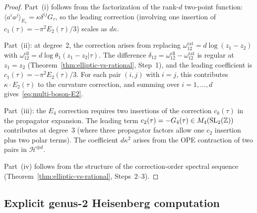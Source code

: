 \begin{proof}
Part~(i) follows from the factorization of the rank-$d$ two-point
function: $\langle a^i a^j \rangle_{E_\tau} = \kappa\delta^{ij}
G_\tau$, so the leading correction (involving one insertion of
$c_1(\tau) = -\pi^2 E_2(\tau)/3$) scales as $d\kappa$.

Part~(ii): at degree~2, the correction arises from replacing
$\omega_{12}^{\mathrm{rat}} = d\log(z_1-z_2)$ with
$\omega_{12}^{\mathrm{ell}} = d\log\theta_1(z_1-z_2|\tau)$.
The difference $\delta_{12} = \omega_{12}^{\mathrm{ell}}
- \omega_{12}^{\mathrm{rat}}$ is regular at $z_1 = z_2$
(Theorem~\ref{thm:elliptic-vs-rational}, Step~1), and the
leading coefficient is $c_1(\tau) = -\pi^2 E_2(\tau)/3$.
For each pair $(i, j)$ with $i = j$, this contributes
$\kappa \cdot E_2(\tau)$ to the curvature correction, and summing
over $i = 1, \ldots, d$ gives~\eqref{eq:multi-boson-E2}.

Part~(iii): the $E_4$ correction requires two insertions of
the correction $c_k(\tau)$ in the propagator expansion.  The
leading term $c_2(\tau) = -G_4(\tau) \in M_4(\mathrm{SL}_2(\mathbb{Z}))$
contributes at degree~$3$ (where three propagator factors allow
one $c_2$ insertion plus two polar terms).  The coefficient $d\kappa^2$
arises from the OPE contraction of two pairs in
$\mathcal{H}^{\oplus d}$.

Part~(iv) follows from the structure of the correction-order
spectral sequence (Theorem~\ref{thm:elliptic-vs-rational},
Steps~2--3).
\end{proof}


\subsection{Explicit genus-2 Heisenberg computation}

